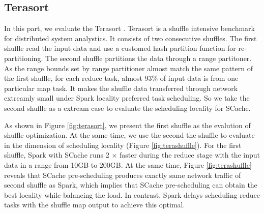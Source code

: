 \subsection{Terasort}
In this part, we evaluate the Terasort \cite{spark-tera}. 
Terasort \cite{spark-tera} is a shuffle intensive benchmark for distributed system analystics. It consists of two consecutive shuffles. The first shuffle read the input data and use a customed hash partition function for re-partitioning. The second shuffle partitions the data through a range partitoner. As the range bounds set by range partitioner almost match the same pattern of the first shuffle, for each reduce task, almost $93\%$ of input data is from one particular map task. It makes the shuffle data transferred through network extreamly small under Spark locality preferred task scheduling. So we take the second shuffle as a extream case to evaluate the scheduling locality for SCache. 

As shown in Figure \ref{fig:terasort}, we present the first shuffle as the evalution of shuffle optimization. At the same time, we use the second the shuffle to evaluate in the dimension of scheduling locality (Figure \ref{fig:terashuffle}). For the first shuffle, Spark with SCache runs 2 $\times$ faster during the reduce stage with the input data in a range from 10GB to 200GB. At the same time, Figure \ref{fig:terashuffle} reveals that SCache pre-scheduling produces exactly same network traffic of second shuffle as Spark, which implies that SCache pre-scheduling can obtain the best locality while balancing the load. In contrast, Spark delays scheduling reduce tasks with the shuffle map output to achieve this optimal.

